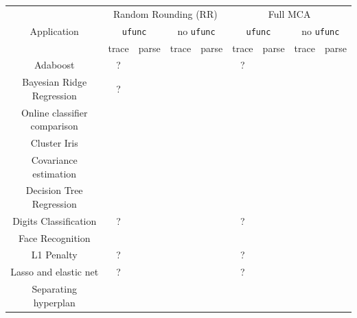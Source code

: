 \documentclass[11pt]{article}
\newcommand{\cross}[0]{\cellcolor{red!65}\ding{53}}
\newcommand{\valid}[0]{\cellcolor{green!75!black}\ding{51}}
\newcommand{\warn}[0]{\cellcolor{orange!75}?}
\begin{document}
\begin{table}[]
    \centering
    \begin{tabular}{|c|c|c|c|c||c|c|c|c|}
    \hline
    \multirow{3}{5em}{Application} & \multicolumn{4}{|c||}{Random Rounding (RR)} & \multicolumn{4}{|c|}{Full MCA} \\\cline{2-9}
                & \multicolumn{2}{|c|}{\texttt{ufunc}} &  \multicolumn{2}{|c||}{no \texttt{ufunc}} & \multicolumn{2}{|c|}{\texttt{ufunc}} & \multicolumn{2}{|c|}{no \texttt{ufunc}} \\\cline{2-9}
                & trace & parse &  trace & parse & trace & parse & trace & parse \\
    \hline
    Adaboost & \warn & \valid & \valid & \valid & \warn & \cross & \cross & \cross \\
    Bayesian Ridge Regression & \warn & \valid & \valid & \valid & \cross & \cross & \cross & \cross \\
    Online classifier comparison & \valid & \valid & \valid & \valid & \cross & \cross & \cross & \cross  \\
    Cluster Iris & \valid & \valid & \valid & \valid & \valid & \cross & \valid & \cross \\
    Covariance estimation & \valid & \cross & \valid & \cross & \cross & \cross & \valid & \cross \\
    Decision Tree Regression & \valid & \valid & \valid & \valid & \valid & \cross & \valid & \cross \\
    Digits Classification & \warn & \valid & \valid & \valid & \warn & \cross & \cross & \cross \\
    Face Recognition & \cross & \valid & \cross & \valid & \cross & \cross & \cross & \cross \\
    L1 Penalty & \warn & \valid & \valid & \valid & \warn & \cross & \valid & \valid \\
    Lasso and elastic net & \warn & \valid & \valid & \valid & \warn & \cross & \valid & \cross \\
    Separating hyperplan & \valid & \valid & \valid & \valid & \valid & \cross & \valid & \cross \\

\end{tabular}
\end{table}
\end{document}
